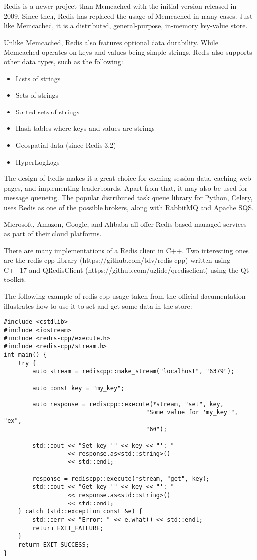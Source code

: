 Redis is a newer project than Memcached with the initial version released in 2009. Since then, Redis has replaced the usage of Memcached in many cases. Just like Memcached, it is a distributed, general-purpose, in-memory key-value store.

Unlike Memcached, Redis also features optional data durability. While Memcached operates on keys and values being simple strings, Redis also supports other data types, such as the following:

\begin{itemize}
\item 
Lists of strings

\item 
Sets of strings

\item 
Sorted sets of strings

\item 
Hash tables where keys and values are strings

\item 
Geospatial data (since Redis 3.2)

\item 
HyperLogLogs
\end{itemize}

The design of Redis makes it a great choice for caching session data, caching web pages, and implementing leaderboards. Apart from that, it may also be used for message queueing. The popular distributed task queue library for Python, Celery, uses Redis as one of the possible brokers, along with RabbitMQ and Apache SQS.

Microsoft, Amazon, Google, and Alibaba all offer Redis-based managed services as part of their cloud platforms.

There are many implementations of a Redis client in C++. Two interesting ones are the redis-cpp library (https://github.com/tdv/redis-cpp) written using C++17 and QRedisClient (https://github.com/uglide/qredisclient) using the Qt toolkit.

The following example of redis-cpp usage taken from the official documentation illustrates how to use it to set and get some data in the store:

\begin{lstlisting}[style=styleCXX]
#include <cstdlib>
#include <iostream>
#include <redis-cpp/execute.h>
#include <redis-cpp/stream.h>
int main() {
	try {
		auto stream = rediscpp::make_stream("localhost", "6379");
		
		auto const key = "my_key";
		
		auto response = rediscpp::execute(*stream, "set", key,
										"Some value for 'my_key'", "ex",
										"60");
		
		std::cout << "Set key '" << key << "': "
				  << response.as<std::string>()
				  << std::endl;
		
		response = rediscpp::execute(*stream, "get", key);
		std::cout << "Get key '" << key << "': "
				  << response.as<std::string>()
				  << std::endl;
	} catch (std::exception const &e) {
		std::cerr << "Error: " << e.what() << std::endl;
		return EXIT_FAILURE;
	}
	return EXIT_SUCCESS;
}
\end{lstlisting}

